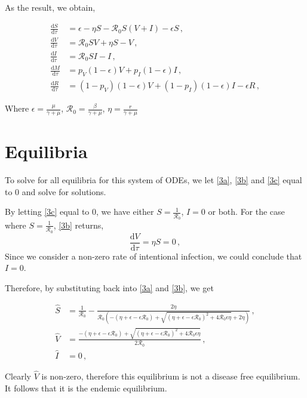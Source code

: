 \documentclass[12pt]{article}
\newcommand\dbyd[2]{\frac{\mathrm d{#1}}{\mathrm d{#2}}}
\newcommand{\R}{\mathcal{R}}
\newcommand{\pmV}{p_{V}}
\newcommand{\pmI}{p_{I}}
\begin{document}
As the result, we obtain,

\begin{subequations}\label{eq:base}
\begin{align}
\dbyd{S}{\tau}&=\epsilon-\eta S-\R_0 S(V+I)-\epsilon S\,, \label{3a}\\
\dbyd{V}{\tau}&=\R_0 SV+\eta S-V\,, \label{3b}\\
\dbyd{I}{\tau}&=\R_0 SI-I\,, \label{3c}\\
\dbyd{M}{\tau}&=\pmV(1-\epsilon) V+\pmI(1-\epsilon) I\,,\\
\dbyd{R}{\tau}&=(1-\pmV)(1-\epsilon) V+(1-\pmI)(1-\epsilon) I-\epsilon R\,,
\end{align}
\end{subequations}

Where $\epsilon=\frac{\mu}{\gamma+\mu}$, $\R_0=\frac{\beta}{\gamma+\mu}$, $\eta=\frac{r}{\gamma+\mu}$

\section{Equilibria}

To solve for all equilibria for this system of ODEs, we let \autoref{3a}, \autoref{3b} and \autoref{3c} equal to 0 and solve for solutions.

By letting \autoref{3c} equal to 0, we have either $S=\frac{1}{\R_0}$, $I=0$ or both. For the case where $S=\frac{1}{\R_0}$, \autoref{3b} returns,
\begin{equation}
\dbyd{V}{\tau}=\eta S =0\,,
\end{equation}
Since we consider a non-zero rate of intentional infection, we could conclude that $I=0$.

Therefore, by substituting back into \autoref{3a} and \autoref{3b}, we get

\begin{subequations}\label{eq:EE}
\begin{align}
\hat{S} &= \frac{1}{\R_0}-\frac{2\eta}{\R_0(-(\eta+\epsilon-\epsilon\R_0)+\sqrt{(\eta+\epsilon-\epsilon\R_0)^2+4\R_0\epsilon \eta}+2\eta)}\,, \label{eq:Shat}\\
\hat{V} &= \frac{-(\eta+\epsilon-\epsilon\R_0)+\sqrt{(\eta+\epsilon-\epsilon\R_0)^2+4\R_0\epsilon \eta}}{2\R_0}\,, \label{eq:Vhat}\\
\hat{I} &= 0\,,
\end{align}
\end{subequations}

Clearly $\hat{V}$ is non-zero, therefore this equilibrium is not a disease free equilibrium. It follows that it is the endemic equilibrium.
\end{document}
